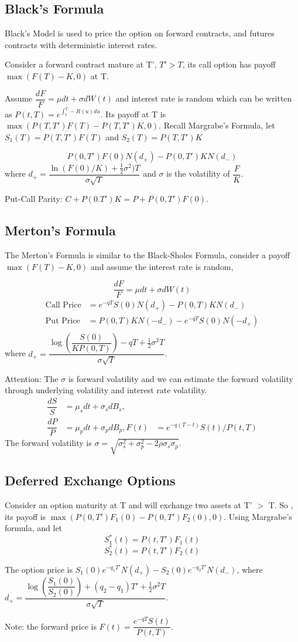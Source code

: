 \documentclass[a4]{article}
\begin{document}
\subsection{Black's Formula}
Black's Model is used to price the option on forward contracts, and futures contracts with deterministic interest rates. \par 
\bigbreak
Consider a forward contract mature at T', $T'>T$, its call option has payoff $\max(F(T)-K, 0)$ at T.\par 
\bigbreak 
Assume $\dfrac{dF}{F}=\mu dt + \sigma dW(t)$ and interest rate is random which can be written as $P(t, T) = e^{\int_{t}^{T}-R(u)du}$. Its payoff at T is $\max(P(T, T')F(T)-P(T, T')K, 0)$. Recall Margrabe's Formula, let $S_{1}(T) = P(T, T')F(T)$ and $S_{2}(T)=P(T, T')K$\par 
$$
P(0, T')F(0)N(d_{+})- P(0, T')KN(d_{-})
$$
where $d_{+} = \dfrac{\ln(F(0)/K) + \frac{1}{2}\sigma^{2})T}{\sigma\sqrt{T} }$ and $\sigma$ is the volatility of $\dfrac{F}{K}$.\par 
\bigbreak
\bigbreak 
Put-Call Parity: $C + P(0. T')K = P + P(0, T')F(0)$.
\subsection{Merton's Formula}
The Merton's Formula is similar to the Black-Sholes Formula, consider a payoff $\max(F(T)-K, 0)$ and assume the interest rate is random,\par 
$$
\dfrac{dF}{F}=\mu dt + \sigma dW(t)
$$
$$
\begin{aligned}
\text{Call Price}&=e^{-qT}S(0)N(d_{+}) - P(0, T)KN(d_{-})\\
\text{Put Price}&= P(0, T)KN(-d_{-}) - e^{-qT}S(0)N(-d_{+})\\
\end{aligned}
$$
where $d_{+}=\dfrac{\log\left(\dfrac{S(0)}{KP(0,T)}\right)-qT + \frac{1}{2}\sigma^{2}T}{\sigma\sqrt{T}}$. \par 
Attention: The $\sigma$ is forward volatility and we can estimate the forward volatility through underlying volatility and interest rate volatility.
$$
\begin{aligned}
\dfrac{dS}{S}&=\mu_{s}dt + \sigma_{s}dB_{s},\\
\dfrac{dP}{P}&=\mu_{p}dt + \sigma_{p}dB_{p},
F(t)&=e^{-q(T-t)}S(t)/P(t, T)
\end{aligned}
$$
The forward volatility is $\sigma= \sqrt{\sigma_{s}^{2} + \sigma_{p}^{2}-2\rho\sigma_{s}\sigma_{p}}$.
\subsection{Deferred Exchange Options}
Consider an option maturity at T and will exchange two assets at T' $>$ T. So , its payoff is $\max (P(0, T')F_{1}(0)-P(0, T')F_{2}(0),0)$. Using Margrabe's formula, and let 
$$
S_{1}^{*}(t) = P(t, T')F_{1}(t)
$$
$$
S_{2}^{*}(t) = P(t, T')F_{2}(t)
$$\par 
The option price is $S_{1}(0)e^{-q_{1}T'}N(d_{+})-S_{2}(0)e^{-q_{2}T'}N(d_{-})$, where $d_{+} = \dfrac{\log(\dfrac{S_{1}(0)}{S_{2}(0)}) + (q_{2}-q_{1})T' + \frac{1}{2}\sigma^{2}T}{\sigma \sqrt{T}}$. \par 
\noindent Note: the forward price is $F(t) = \dfrac{e^{-qT}S(t)}{P(t, T)}$.
\end{document}
